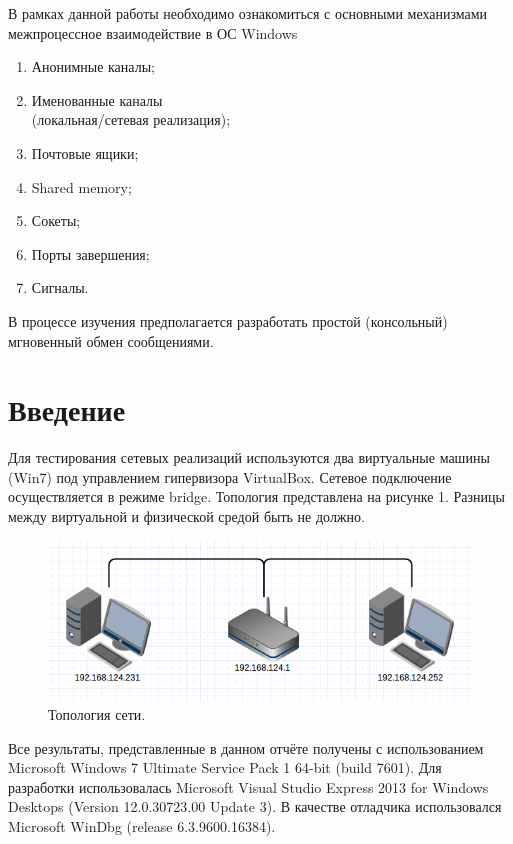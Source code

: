 \documentclass[a4paper, 12pt]{report}		%
\begin{document}
В рамках данной работы необходимо ознакомиться с основными механизмами межпроцессное взаимодействие в ОС Windows
\begin{enumerate}
    \item Анонимные каналы;
    \item Именованные каналы \\
        (локальная/сетевая реализация);
    \item Почтовые ящики;
    \item Shared memory;
    \item Сокеты;
    \item Порты завершения;
    \item Сигналы.
\end{enumerate}

В процессе изучения предполагается разработать простой (консольный) мгновенный обмен сообщениями.

\chapter*{Введение}

\vspace{1em}
Для тестирования сетевых реализаций используются два виртуальные машины (Win7) под управлением гипервизора VirtualBox. Сетевое подключение осуществляется в режиме bridge. Топология представлена на рисунке 1. Разницы между виртуальной и физической средой быть не должно.

\begin{figure}[h!]
\centering
\includegraphics[scale=0.7]{res/01_topology}
\caption{Топология сети.}
\end{figure}

\vspace{1em}
Все результаты, представленные в данном отчёте получены с использованием Microsoft Windows 7 Ultimate Service Pack 1 64-bit (build 7601). Для разработки использовалась Microsoft Visual Studio Express 2013 for Windows Desktops (Version 12.0.30723.00 Update 3). В качестве отладчика использовался Microsoft WinDbg (release 6.3.9600.16384).
\end{document}
